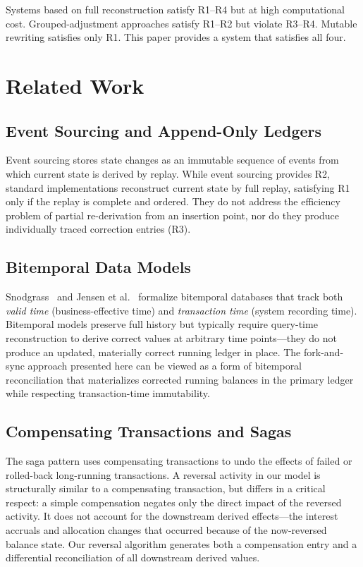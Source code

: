 \documentclass[11pt,letterpaper]{article}
\begin{document}
Systems based on full reconstruction satisfy R1--R4 but at high
computational cost. Grouped-adjustment approaches satisfy R1--R2 but
violate R3--R4. Mutable rewriting satisfies only R1. This paper
provides a system that satisfies all four.

\section{Related Work}
\label{sec:related}

\subsection{Event Sourcing and Append-Only Ledgers}

Event sourcing \cite{fowler2005} stores state changes as an immutable
sequence of events from which current state is derived by replay. While
event sourcing provides R2, standard implementations reconstruct current
state by full replay, satisfying R1 only if the replay is complete and
ordered. They do not address the efficiency problem of partial
re-derivation from an insertion point, nor do they produce individually
traced correction entries (R3).

\subsection{Bitemporal Data Models}

Snodgrass~\cite{snodgrass1999} and Jensen et al.~\cite{jensen1994}
formalize bitemporal databases that track both \emph{valid time}
(business-effective time) and \emph{transaction time} (system recording
time). Bitemporal models preserve full history but typically require
query-time reconstruction to derive correct values at arbitrary time
points---they do not produce an updated, materially correct running
ledger in place. The fork-and-sync approach presented here can be
viewed as a form of bitemporal reconciliation that materializes
corrected running balances in the primary ledger while respecting
transaction-time immutability.

\subsection{Compensating Transactions and Sagas}

The saga pattern \cite{garciamolinasalem1987} uses compensating
transactions to undo the effects of failed or rolled-back long-running
transactions. A reversal activity in our model is structurally similar
to a compensating transaction, but differs in a critical respect: a
simple compensation negates only the direct impact of the reversed
activity. It does not account for the downstream derived effects---the
interest accruals and allocation changes that occurred because of the
now-reversed balance state. Our reversal algorithm generates both a
compensation entry and a differential reconciliation of all downstream
derived values.
\end{document}
